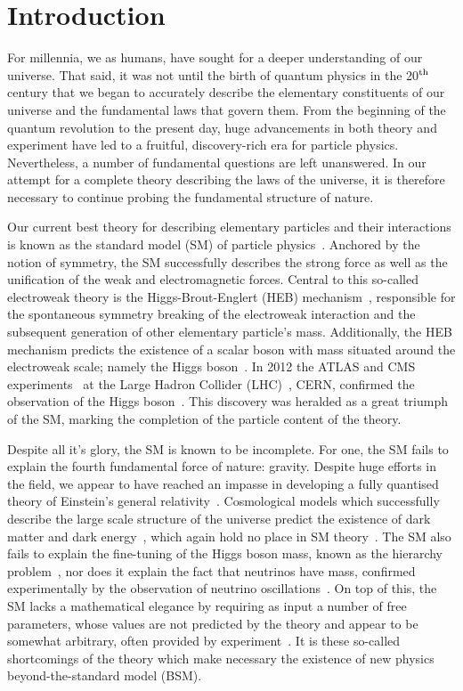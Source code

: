 \chapter{Introduction}
\label{chap:intro}

For millennia, we as humans, have sought for a deeper understanding of our universe. That said, it was not until the birth of quantum physics in the 20$^{\rm{th}}$ century that we began to accurately describe the elementary constituents of our universe and the fundamental laws that govern them. From the beginning of the quantum revolution to the present day, huge advancements in both theory and experiment have led to a fruitful, discovery-rich era for particle physics. Nevertheless, a number of fundamental questions are left unanswered. In our attempt for a complete theory describing the laws of the universe, it is therefore necessary to continue probing the fundamental structure of nature.

Our current best theory for describing elementary particles and their interactions is known as the standard model (SM) of particle physics~\cite{}. Anchored by the notion of symmetry, the SM successfully describes the strong force as well as the unification of the weak and electromagnetic forces. Central to this so-called electroweak theory is the Higgs-Brout-Englert (HEB) mechanism~\cite{}, responsible for the spontaneous symmetry breaking of the electroweak interaction and the subsequent generation of other elementary particle's mass. Additionally, the HEB mechanism predicts the existence of a scalar boson with mass situated around the electroweak scale; namely the Higgs boson~\cite{}. In 2012 the ATLAS and CMS experiments~\cite{} at the Large Hadron Collider (LHC)~\cite{}, CERN, confirmed the observation of the Higgs boson~\cite{}. This discovery was heralded as a great triumph of the SM, marking the completion of the particle content of the theory.

Despite all it's glory, the SM is known to be incomplete. For one, the SM fails to explain the fourth fundamental force of nature: gravity. Despite huge efforts in the field, we appear to have reached an impasse in developing a fully quantised theory of Einstein's general relativity~\cite{}. Cosmological models which successfully describe the large scale structure of the universe predict the existence of dark matter and dark energy~\cite{}, which again hold no place in SM theory~\cite{}. The SM also fails to explain the fine-tuning of the Higgs boson mass, known as the hierarchy problem~\cite{}, nor does it explain the fact that neutrinos have mass, confirmed experimentally by the observation of neutrino oscillations~\cite{}. On top of this, the SM lacks a mathematical elegance by requiring as input a number of free parameters, whose values are not predicted by the theory and appear to be somewhat arbitrary, often provided by experiment~\cite{}. It is these so-called shortcomings of the theory which make necessary the existence of new physics beyond-the-standard model (BSM).

